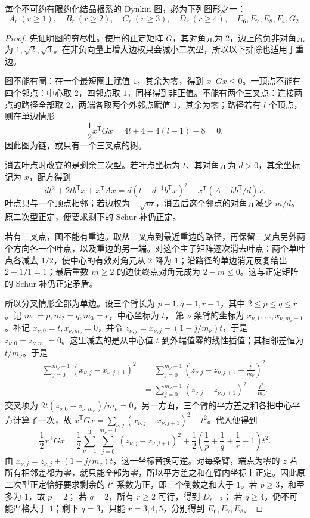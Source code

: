 \begin{lemma}\label{b5:lem:finite-dynkin-list}
	每个不可约有限约化结晶根系的 Dynkin 图，必为下列图形之一：
	\[
		A_r\ (r\geq1),\quad B_r\ (r\geq2),\quad C_r\ (r\geq3),\quad D_r\ (r\geq4),\quad E_6,E_7,E_8,F_4,G_2.
	\]
\end{lemma}
\begin{proof}
	先证明图的穷尽性。使用的正定矩阵 \(G\)，其对角元为 \(2\)，边上的负非对角元为 \(1,\sqrt2,\sqrt3\)。在非负向量上增大边权只会减小二次型，所以以下排除也适用于重边。

	图不能有圈：在一个最短圈上赋值 \(1\)，其余为零，得到 \(x^{\mathsf T}Gx\leq0\)。一顶点不能有四个邻点：中心取 \(2\)，四邻点取 \(1\)，同样得到非正值。不能有两个三叉点：连接两点的路径全部取 \(2\)，两端各取两个外邻点赋值 \(1\)，其余为零；路径若有 \(l\) 个顶点，则在单边情形
	\[
		\frac12x^{\mathsf T}Gx=4l+4-4(l-1)-8=0.
	\]
	因此图为链，或只有一个三叉点的树。

	消去叶点时改变的是剩余二次型。若叶点坐标为 \(t\)、其对角元为 \(d>0\)，其余坐标记为 \(x\)，配方得到
	\[
		dt^2+2t b^{\mathsf T}x+x^{\mathsf T}Ax =d(t+d^{-1}b^{\mathsf T}x)^2+x^{\mathsf T}(A-bb^{\mathsf T}/d)x.
	\]
	叶点只与一个顶点相邻；若边权为 \(-\sqrt m\)，消去后这个邻点的对角元减少 \(m/d\)。原二次型正定，便要求剩下的 Schur 补仍正定。

	若有三叉点，图不能有重边。取从三叉点到最近重边的路径，再保留三叉点另外两个方向各一个叶点，以及重边的另一端。对这个主子矩阵逐次消去叶点：两个单叶点各减去 \(1/2\)，使中心的有效对角元从 \(2\) 降为 \(1\)；沿路径的单边消元反复给出 \(2-1/1=1\)；最后重数 \(m\geq2\) 的边使终点对角元成为 \(2-m\leq0\)。这与正定矩阵的 Schur 补仍正定矛盾。

	所以分叉情形全部为单边。设三个臂长为 \(p-1,q-1,r-1\)，其中 \(2\leq p\leq q\leq r\)。记 \(m_1=p,m_2=q,m_3=r\)，中心坐标为 \(t\)， 第 \(\nu\) 条臂的坐标为 \(x_{\nu,1},\ldots,x_{\nu,m_\nu-1}\)。补记 \(x_{\nu,0}=t,x_{\nu,m_\nu}=0\)，并令 \(z_{\nu,j}=x_{\nu,j}-(1-j/m_\nu)t\)，于是 \(z_{\nu,0}=z_{\nu,m_\nu}=0\)。这里减去的是从中心值 \(t\) 到外端值零的线性插值；其相邻差恒为 \(t/m_\nu\)。于是
	\[
		\begin{aligned}
			\sum_{j=0}^{m_\nu-1}(x_{\nu,j}-x_{\nu,j+1})^2 &=\sum_{j=0}^{m_\nu-1} \left(z_{\nu,j}-z_{\nu,j+1}+\frac{t}{m_\nu}\right)^2\\
			&=\sum_{j=0}^{m_\nu-1}(z_{\nu,j}-z_{\nu,j+1})^2 +\frac{t^2}{m_\nu}.
		\end{aligned}
	\]
	交叉项为 \(2t(z_{\nu,0}-z_{\nu,m_\nu})/m_\nu=0\)。另一方面，三个臂的平方差之和各把中心平方计算了一次，故 \(x^{\mathsf T}Gx=\sum_{\nu,j}(x_{\nu,j}-x_{\nu,j+1})^2-t^2\)。代入便得到
	\[
		\frac12x^{\mathsf T}Gx =\frac12\sum_{\nu=1}^3\sum_{j=0}^{m_\nu-1}(z_{\nu,j}-z_{\nu,j+1})^2 +\frac12\left(\frac1p+\frac1q+\frac1r-1\right)t^2.
	\]
	由 \(x_{\nu,j}=z_{\nu,j}+(1-j/m_\nu)t\)，这一坐标替换可逆。对每条臂，端点为零的 \(z\) 若所有相邻差都为零，就只能全部为零，所以平方差之和在臂内坐标上正定。因此原二次型正定恰好要求剩余的 \(t^2\) 系数为正，即三个倒数之和大于 \(1\)。若 \(p\geq3\)，和至多为 \(1\)，故 \(p=2\)； 若 \(q=2\)，所有 \(r\geq2\) 可行，得到 \(D_{r+2}\)； 若 \(q\geq4\)，仍不可能严格大于 \(1\)；剩下 \(q=3\)，只能 \(r=3,4,5\)，分别得到 \(E_6,E_7,E_8\)。


\end{proof}

